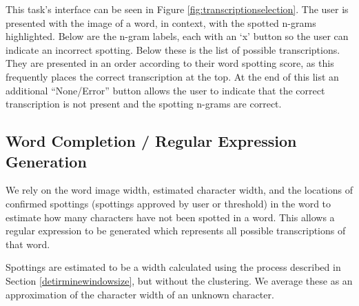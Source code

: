 \documentclass[ms,electronic,twosidetoc,letterpaper,chaptercenter,parttop,lof,lot]{byumsphd}
\begin{document}
This task's interface can be seen in Figure \ref{fig:transcriptionselection}.
The user is presented with the image of a word, in context, with the spotted n-grams highlighted. Below are the n-gram labels, each with an `x' button so the user can indicate an incorrect spotting.
Below these is the list of possible transcriptions. They are presented in an order according to their word spotting score, as this frequently places the correct transcription at the top.
At the end of this list an additional ``None/Error'' button allows the user to indicate that the correct transcription is not present and the spotting n-grams are correct.






\subsection{Word Completion / Regular Expression Generation}\label{wordcompletion}
We rely on the word image width, estimated character width, and the locations of confirmed spottings (spottings approved by user or threshold) in the word to estimate how many characters have not been spotted in a word. This allows a regular expression to be generated which represents all possible transcriptions of that word.

Spottings are estimated to be a width calculated using the process described in Section \ref{detirminewindowsize}, but without the clustering.
We average these as an approximation of the character width of an unknown character.
\end{document}
